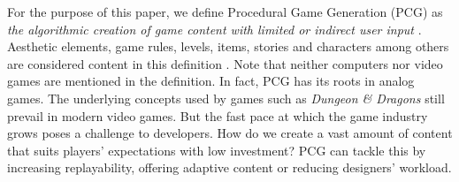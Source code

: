 \documentclass[sigconf]{acmart}
\begin{document}
For the purpose of this paper, we define Procedural Game Generation
(PCG) as \textit{the algorithmic creation of game content with
  limited or indirect user input} \cite{togelius2011procedural}. 
Aesthetic elements, game rules, levels, items, stories and characters
among others are considered content in this definition  
\cite{togelius2011procedural}. %
Note that neither computers nor video games are mentioned in the
definition. In fact, PCG has its roots in analog games.
The underlying concepts used by games such as \textit{Dungeon \& Dragons} still 
prevail in modern video games. \cite{smith2015analog} 
%
But the fast pace at which the game industry grows poses a challenge to developers. 
How do we create a vast amount of content that suits 
players' expectations with low investment? PCG can tackle this by  
increasing replayability, offering adaptive content or reducing designers' 
workload.\cite{togelius2016introduction}
\end{document}
